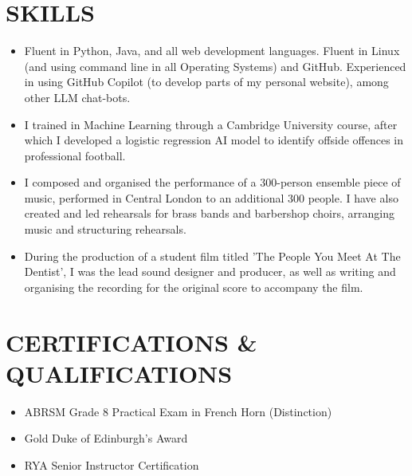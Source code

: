 \documentclass[paper=a4,fontsize=11pt]{scrartcl}
\newcommand{\bulletpoint}{
{\large $\triangleright$}
}
\newcommand{\sepspace}{\vspace*{0.3em}}
\newcommand{\NewPart}[1]{%
  \vspace{-0.6em}%
  \section*{\uppercase{#1}}%
  \vspace{-0.4em}%
}
\begin{document}
\NewPart{Skills}
\begin{itemize}
    \item[\bulletpoint]{Fluent in Python, Java, and all web development languages. Fluent in Linux (and using command line in all Operating Systems) and GitHub. Experienced in using GitHub Copilot (to develop parts of my personal website), among other LLM chat-bots.}
    \item[\bulletpoint] I trained in Machine Learning through a Cambridge University course, after which I developed a logistic regression AI model to identify offside offences in professional football.
    \item[\bulletpoint] I composed and organised the performance of a 300-person ensemble piece of music, performed in Central London to an additional 300 people. I have also created and led rehearsals for brass bands and barbershop choirs, arranging music and structuring rehearsals.
    \item[\bulletpoint] During the production of a student film titled 'The People You Meet At The Dentist', I was the lead sound designer and producer, as well as writing and organising the recording for the original score to accompany the film.
\end{itemize}
\sepspace

\NewPart{Certifications \& Qualifications}
\begin{itemize}
    \item[\bulletpoint] ABRSM Grade 8 Practical Exam in French Horn (Distinction) 
    \item[\bulletpoint] Gold Duke of Edinburgh’s Award
    \item[\bulletpoint] RYA Senior Instructor Certification
\end{itemize}
\end{document}
